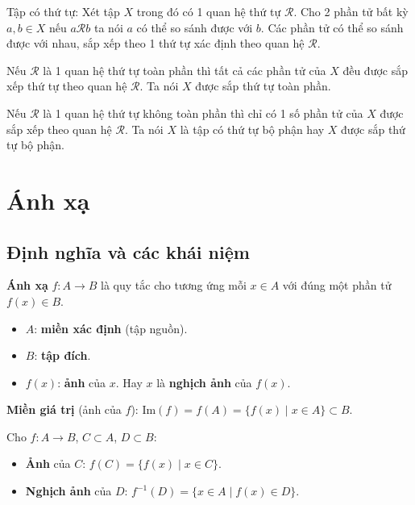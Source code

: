 \documentclass[12pt,a4paper]{article}
\begin{document}
\begin{dinhnghia}
    Tập có thứ tự: Xét tập $X$ trong đó có 1 quan hệ thứ tự $\mathcal{R}$. Cho 2 phần tử bất kỳ $a, b \in X$ nếu $a \mathcal{R} b$ ta nói $a$ có thể so sánh được với $b$. Các phần tử có thể so sánh được với nhau, sắp xếp theo 1 thứ tự xác định theo quan hệ $\mathcal{R}$.

    Nếu $\mathcal{R}$ là 1 quan hệ thứ tự toàn phần thì tất cả các phần tử của $X$ đều được sắp xếp thứ tự theo quan hệ $\mathcal{R}$. Ta nói $X$ được sắp thứ tự toàn phần.

    Nếu $\mathcal{R}$ là 1 quan hệ thứ tự không toàn phần thì chỉ có 1 số phần tử của $X$ được sắp xếp theo quan hệ $\mathcal{R}$. Ta nói $X$ là tập có thứ tự bộ phận hay $X$ được sắp thứ tự bộ phận.
\end{dinhnghia}

\section{Ánh xạ}

\subsection{Định nghĩa và các khái niệm}

\begin{dinhnghia}
  \textbf{Ánh xạ} $f: A \to B$ là quy tắc cho tương ứng mỗi $x \in A$ với đúng một phần tử $f(x) \in B$.
  \begin{itemize}
    \item $A$: \textbf{miền xác định} (tập nguồn).
    \item $B$: \textbf{tập đích}.
    \item $f(x)$: \textbf{ảnh} của $x$. Hay $x$ là \textbf{nghịch ảnh} của $f(x)$.
  \end{itemize}
\end{dinhnghia}

\begin{dinhnghia}
  \textbf{Miền giá trị} (ảnh của $f$): $\mathrm{Im}(f) = f(A) = \{f(x) \mid x \in A\} \subset B$.
\end{dinhnghia}

\begin{dinhnghia}
  Cho $f: A \to B$, $C \subset A$, $D \subset B$:
  \begin{itemize}
    \item \textbf{Ảnh} của $C$: $f(C) = \{f(x) \mid x \in C\}$.
    \item \textbf{Nghịch ảnh} của $D$: $f^{-1}(D) = \{x \in A \mid f(x) \in D\}$.
  \end{itemize}
\end{dinhnghia}
\end{document}
